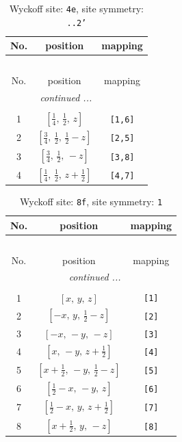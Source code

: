 \documentclass[fleqn,8pt]{jsarticle}
\begin{document}
\renewcommand{\arraystretch}{1.2}
\begin{longtable}{ccc}
\caption{Wyckoff site: {\tt 4e}, site symmetry: {\tt ..2'}}
 \\
 \hline \hline
No. & position & mapping \\ \hline \endfirsthead

\multicolumn{2}{l}{\tablename\ \thetable{}} \\
 \hline \hline
No. & position & mapping \\ \hline \endhead

 \hline \hline
\multicolumn{2}{r}{\footnotesize\it continued ...} \\ \endfoot

 \hline \hline
\multicolumn{2}{r}{} \\ \endlastfoot

1 & $\left[ \frac{1}{4},\, \frac{1}{2},\, z \right]$ & {\tt [1,6]} \\ \hline
2 & $\left[ \frac{3}{4},\, \frac{1}{2},\, \frac{1}{2} - z \right]$ & {\tt [2,5]} \\ \hline
3 & $\left[ \frac{3}{4},\, \frac{1}{2},\, - z \right]$ & {\tt [3,8]} \\ \hline
4 & $\left[ \frac{1}{4},\, \frac{1}{2},\, z + \frac{1}{2} \right]$ & {\tt [4,7]} \\
\end{longtable}
\renewcommand{\arraystretch}{1.2}
\begin{longtable}{ccc}
\caption{Wyckoff site: {\tt 8f}, site symmetry: {\tt 1}}
 \\
 \hline \hline
No. & position & mapping \\ \hline \endfirsthead

\multicolumn{2}{l}{\tablename\ \thetable{}} \\
 \hline \hline
No. & position & mapping \\ \hline \endhead

 \hline \hline
\multicolumn{2}{r}{\footnotesize\it continued ...} \\ \endfoot

 \hline \hline
\multicolumn{2}{r}{} \\ \endlastfoot

1 & $\left[ x,\, y,\, z \right]$ & {\tt [1]} \\ \hline
2 & $\left[ - x,\, y,\, \frac{1}{2} - z \right]$ & {\tt [2]} \\ \hline
3 & $\left[ - x,\, - y,\, - z \right]$ & {\tt [3]} \\ \hline
4 & $\left[ x,\, - y,\, z + \frac{1}{2} \right]$ & {\tt [4]} \\ \hline
5 & $\left[ x + \frac{1}{2},\, - y,\, \frac{1}{2} - z \right]$ & {\tt [5]} \\ \hline
6 & $\left[ \frac{1}{2} - x,\, - y,\, z \right]$ & {\tt [6]} \\ \hline
7 & $\left[ \frac{1}{2} - x,\, y,\, z + \frac{1}{2} \right]$ & {\tt [7]} \\ \hline
8 & $\left[ x + \frac{1}{2},\, y,\, - z \right]$ & {\tt [8]} \\
\end{longtable}
\end{document}
